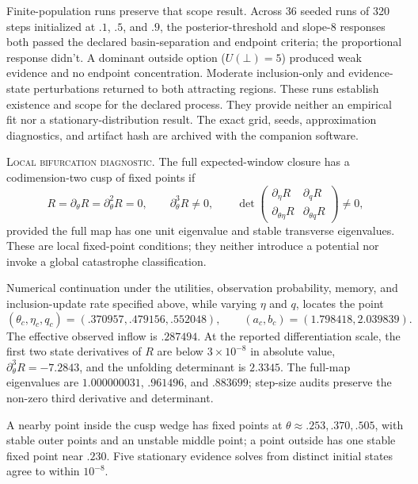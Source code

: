 Finite-population runs preserve that scope result. Across 36 seeded runs of 320
steps initialized at $.1$, $.5$, and $.9$, the posterior-threshold and
slope-$8$ responses both passed the declared basin-separation and endpoint
criteria; the proportional response didn't. A dominant outside option
($U(\bot)=5$) produced weak evidence and no endpoint concentration. Moderate
inclusion-only and evidence-state perturbations returned to both attracting
regions. These runs establish existence and scope for the declared process.
They provide neither an empirical fit nor a stationary-distribution result. The
exact grid, seeds, approximation diagnostics, and artifact hash are archived
with the companion software.

\noindent\textsc{Local bifurcation diagnostic.} The full expected-window closure
has a codimension-two cusp of fixed points if
\begin{equation}
R=\partial_\theta R=\partial^2_\theta R=0,
\qquad
\partial^3_\theta R\neq0,
\qquad
\det
\begin{pmatrix}
\partial_\eta R & \partial_q R \\
\partial_{\theta\eta}R & \partial_{\theta q}R
\end{pmatrix}
\neq0,
\label{eq:cusp-conditions}
\end{equation}
provided the full map has one unit eigenvalue and stable transverse
eigenvalues. These are local fixed-point conditions; they neither introduce a
potential nor invoke a global catastrophe classification.

Numerical continuation under the utilities, observation probability, memory,
and inclusion-update rate specified above, while varying $\eta$ and $q$, locates
the point
\[
(\theta_c,\eta_c,q_c)=(.370957,.479156,.552048),
\qquad
(a_c,b_c)=(1.798418,2.039839).
\]
The effective observed inflow is $.287494$. At the reported differentiation
scale, the first two state derivatives of $R$ are below $3\times10^{-8}$ in
absolute value, $\partial^3_\theta R=-7.2843$, and the unfolding determinant
is $2.3345$. The full-map eigenvalues are $1.000000031$, $.961496$, and
$.883699$; step-size audits preserve the non-zero third derivative and
determinant.

A nearby point inside the cusp wedge has fixed points at
$\theta\approx.253,.370,.505$, with stable outer points and an unstable middle
point; a point outside has one stable fixed point near $.230$. Five stationary
evidence solves from distinct initial states agree to within $10^{-8}$.

